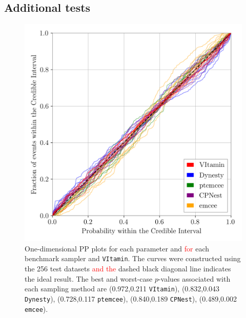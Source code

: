 \documentclass[%
showpacs,
nofootinbib,
 amsmath,amssymb,
 aps,
 twocolumn,
 prl,
 reprint,
floatfix,
]{revtex4-1}
\newcommand{\new}[1]{\textcolor{red}{#1}}
\begin{document}
\subsection{Additional tests}
%
%
\begin{figure}
    \includegraphics[width=\columnwidth]{latest_pp_plot.png}
    \caption{\label{fig:pp_plot} One-dimensional \ac{PP} plots for each
parameter and \new{for} each benchmark sampler and \texttt{VItamin}. The curves were
constructed using the 256 test datasets \new{and the} dashed black diagonal line
indicates the ideal result. The best and worst-case $p$-values associated with each
sampling method are (0.972,0.211 \texttt{VItamin}), (0.832,0.043 \texttt{Dynesty}), (0.728,0.117
\texttt{ptemcee}), (0.840,0.189 \texttt{CPNest}), (0.489,0.002 \texttt{emcee}). 
}
\end{figure}
%
\end{document}
